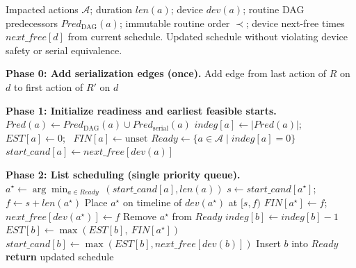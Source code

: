 \begin{algorithm}[t]
    \caption{\bf Shortest Task First (STF) with Serializability}
    \label{algo:sjfw}
    \footnotesize
    \begin{algorithmic}[1]
    \Require Impacted actions $\mathcal{A}$; duration $len(a)$; device $dev(a)$;
             routine DAG predecessors $Pred_{\text{DAG}}(a)$; immutable routine order $\prec$;
             device next-free times $next\_free[d]$ from current schedule.
    \Ensure Updated schedule without violating device safety or serial equivalence.
    
    \Statex \textbf{Phase 0: Add serialization edges (once).}
        \State Add edge from last action of $R$ on $d$ to first action of $R'$ on $d$
      \EndFor
    \EndFor
    
    \Statex \textbf{Phase 1: Initialize readiness and earliest feasible starts.}
      \State $Pred(a) \gets Pred_{\text{DAG}}(a) \cup Pred_{\text{serial}}(a)$
      \State $indeg[a] \gets |Pred(a)|$; \ $EST[a] \gets 0$; \ $FIN[a] \gets \text{unset}$
    \EndFor
    \State $Ready \gets \{ a \in \mathcal{A} \mid indeg[a]=0 \}$
      \State $start\_cand[a] \gets next\_free[dev(a)]$
    \EndFor
    
    \Statex \textbf{Phase 2: List scheduling (single priority queue).}
      \State $a^\star \gets \arg\min_{a \in Ready} \ (start\_cand[a], len(a))$ 
      \State $s \gets start\_cand[a^\star]$; \ $f \gets s + len(a^\star)$
      \State Place $a^\star$ on timeline of $dev(a^\star)$ at $[s,f)$
      \State $FIN[a^\star] \gets f$; \ $next\_free[dev(a^\star)] \gets f$
      \State Remove $a^\star$ from $Ready$
        \State $indeg[b] \gets indeg[b]-1$
        \State $EST[b] \gets \max(EST[b], \ FIN[a^\star])$
          \State $start\_cand[b] \gets \max(EST[b], next\_free[dev(b)])$
          \State Insert $b$ into $Ready$
        \EndIf
      \EndFor
    \EndWhile
    \State \textbf{return} updated schedule
\end{algorithmic}
\end{algorithm}

